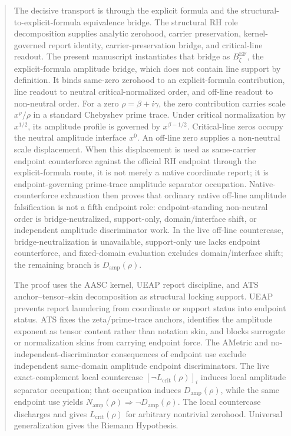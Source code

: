 \documentclass[11pt]{article}
\newcommand{\Lcrit}{L_{\mathrm{crit}}}
\newcommand{\Damp}{D_{\mathrm{amp}}}
\newcommand{\BzetaEF}{B^{\mathrm{EF}}_{\zeta}}
\begin{document}
\begin{abstract}
The decisive transport is through the explicit formula and the structural-to-explicit-formula equivalence bridge.  The structural RH role decomposition supplies analytic zerohood, carrier preservation, kernel-governed report identity, carrier-preservation bridge, and critical-line readout.  The present manuscript instantiates that bridge as \(\BzetaEF\), the explicit-formula amplitude bridge, which does not contain line support by definition.  It binds same-zero zerohood to an explicit-formula contribution, line readout to neutral critical-normalized order, and off-line readout to non-neutral order.  For a zero \(\rho=\beta+i\gamma\), the zero contribution carries scale \(x^{\rho}/\rho\) in a standard Chebyshev prime trace.  Under critical normalization by \(x^{1/2}\), its amplitude profile is governed by \(x^{\beta-1/2}\).  Critical-line zeros occupy the neutral amplitude interface \(x^0\).  An off-line zero supplies a non-neutral scale displacement.  When this displacement is used as same-carrier endpoint counterforce against the official RH endpoint through the explicit-formula route, it is not merely a native coordinate report; it is endpoint-governing prime-trace amplitude separator occupation.  Native-counterforce exhaustion then proves that ordinary native off-line amplitude falsification is not a fifth endpoint role: endpoint-standing non-neutral order is bridge-neutralized, support-only, domain/interface shift, or independent amplitude discriminator work.  In the live off-line countercase, bridge-neutralization is unavailable, support-only use lacks endpoint counterforce, and fixed-domain evaluation excludes domain/interface shift; the remaining branch is \(\Damp(\rho)\).

The proof uses the AASC kernel, UEAP report discipline, and ATS anchor--tensor--skin decomposition as structural locking support.  UEAP prevents report laundering from coordinate or support status into endpoint status.  ATS fixes the zeta/prime-trace anchors, identifies the amplitude exponent as tensor content rather than notation skin, and blocks surrogate or normalization skins from carrying endpoint force.  The AMetric and no-independent-discriminator consequences of endpoint use exclude independent same-domain amplitude endpoint discriminators.  The live exact-complement local countercase \([\neg\Lcrit(\rho)]_i\) induces local amplitude separator occupation; that occupation induces \(D_{\mathrm{amp}}(\rho)\), while the same endpoint use yields \(N_{\mathrm{amp}}(\rho)\Rightarrow \neg D_{\mathrm{amp}}(\rho)\).  The local countercase discharges and gives \(\Lcrit(\rho)\) for arbitrary nontrivial zerohood.  Universal generalization gives the Riemann Hypothesis.
\end{abstract}
\end{document}
